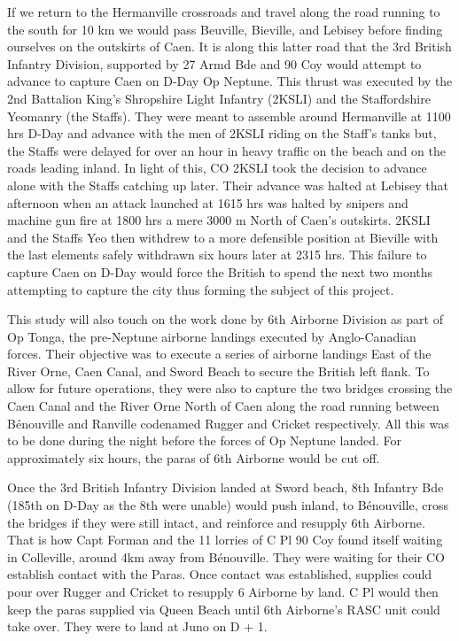 \documentclass[noraggedright]{turabian-researchpaper}
\begin{document}
If we return to the Hermanville crossroads and travel along the road running
to the south for 10 km we would pass Beuville, Bieville, and Lebisey before
finding ourselves on the outskirts of Caen.  It is along this latter 
road that the 3rd British Infantry Division, supported by 27 Armd Bde and 90 
Coy would attempt to advance to capture Caen on D-Day Op Neptune.  This 
thrust was executed by the 2nd Battalion King's Shropshire Light Infantry 
(2KSLI) and the Staffordshire Yeomanry (the Staffs).%
They were meant to assemble around Hermanville at 1100 hrs D-Day and 
advance with the men of 2KSLI riding on the Staff's tanks but, the Staffs 
were delayed for over an hour in heavy traffic on the beach and on the roads 
leading inland.  In light of this,
CO 2KSLI took the decision to advance alone with the Staffs catching up 
later.\autocite[1100 -- 1230 hrs 6 June 1944]{2KSLIwd} Their advance was 
halted at Lebisey that afternoon when an attack launched at 1615 hrs was 
halted by snipers and machine gun fire at 1800 hrs a mere 3000 m North of 
Caen's outskirts.  2KSLI and the Staffs Yeo then withdrew to a more 
defensible position at Bieville with the last elements safely withdrawn six 
hours later at 2315 hrs.\autocites[6 June 1944]{staffswd}[1630 -- 2315] 
{2KSLIwd} This failure to capture Caen on D-Day would force the British to 
spend the next two months attempting to capture the city thus forming the
subject of this project.

This study will also touch on the work done by 6th Airborne Division as part 
of Op Tonga, the pre-Neptune airborne landings executed by Anglo-Canadian 
forces.  Their objective was to execute a series of airborne landings East of 
the River Orne, Caen Canal, and Sword Beach to secure the British left flank.  
To allow for future operations, they were also to capture the two bridges
crossing the Caen Canal and the River Orne North of Caen along the road 
running between Bénouville and Ranville codenamed Rugger and Cricket 
respectively.\autocite[Appendix 15 to May diaries.  Overlord Operation Order 
No. 1 Appendex E Part II][]{185wd} 
All this was to be done during the night before the forces of
Op Neptune landed.  For approximately six hours, the paras of 6th Airborne
would be cut off.  

Once the  3rd British Infantry Division landed at Sword beach, 8th Infantry 
Bde (185th on D-Day as the 8th were unable) would push inland, to Bénouville, 
cross the bridges if they were still intact, and reinforce and resupply 6th 
Airborne.\autocite[\textit{The operations of 185 Inf Bde on D Day and D + 1}
(found at the end of June's diaries)][2]{185wd}
That is how Capt Forman and the 11 lorries of C Pl 90 Coy found itself 
waiting in Colleville, around 4km away from Bénouville.  They were waiting 
for their CO establish contact with the Paras.  Once contact was established, 
supplies could pour over Rugger and Cricket to resupply 6 Airborne by 
land.  C Pl would then keep the paras supplied via Queen Beach until 6th 
Airborne's RASC unit could take over.  They were to land at Juno on 
D + 1.\autocite[1]{90wdjun}
\end{document}
